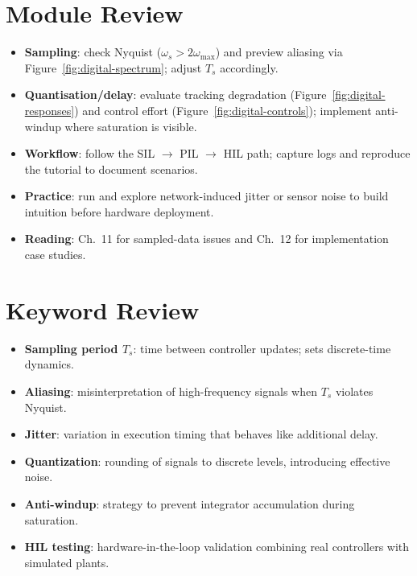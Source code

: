 \section{Module Review}
\begin{itemize}[leftmargin=*]
    \item \textbf{Sampling}: check Nyquist ($\omega_s > 2\omega_{\max}$) and preview aliasing via Figure~\ref{fig:digital-spectrum}; adjust $T_s$ accordingly.
    \item \textbf{Quantisation/delay}: evaluate tracking degradation (Figure~\ref{fig:digital-responses}) and control effort (Figure~\ref{fig:digital-controls}); implement anti-windup where saturation is visible.
    \item \textbf{Workflow}: follow the SIL $\rightarrow$ PIL $\rightarrow$ HIL path; capture logs and reproduce the tutorial to document scenarios.
    \item \textbf{Practice}: run  and explore network-induced jitter or sensor noise to build intuition before hardware deployment.
    \item \textbf{Reading}: \textcite{astrom2006advanced} Ch.~11 for sampled-data issues and \textcite{ljung2012control} Ch.~12 for implementation case studies.
\end{itemize}

\section{Keyword Review}
\begin{vocabulary}
\begin{itemize}[leftmargin=*]
    \item \textbf{Sampling period $T_s$}: time between controller updates; sets discrete-time dynamics.
    \item \textbf{Aliasing}: misinterpretation of high-frequency signals when $T_s$ violates Nyquist.
    \item \textbf{Jitter}: variation in execution timing that behaves like additional delay.
    \item \textbf{Quantization}: rounding of signals to discrete levels, introducing effective noise.
    \item \textbf{Anti-windup}: strategy to prevent integrator accumulation during saturation.
    \item \textbf{HIL testing}: hardware-in-the-loop validation combining real controllers with simulated plants.
\end{itemize}
\end{vocabulary}
